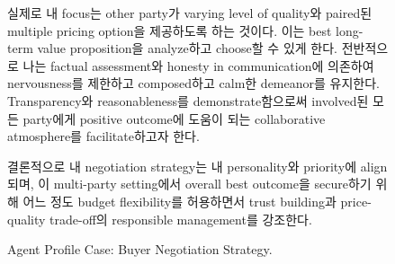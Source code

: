 \begin{figure}[htbp]
\begin{tcolorbox}[colback=blue!2!white, colframe=gray!50!blue]
\begin{minipage}{\linewidth}
실제로 내 focus는 other party가 varying level of quality와 paired된 multiple pricing option을 제공하도록 하는 것이다. 이는 best long-term value proposition을 analyze하고 choose할 수 있게 한다. 전반적으로 나는 factual assessment와 honesty in communication에 의존하여 nervousness를 제한하고 composed하고 calm한 demeanor를 유지한다. Transparency와 reasonableness를 demonstrate함으로써 involved된 모든 party에게 positive outcome에 도움이 되는 collaborative atmosphere를 facilitate하고자 한다.

결론적으로 내 negotiation strategy는 내 personality와 priority에 align되며, 이 multi-party setting에서 overall best outcome을 secure하기 위해 어느 정도 budget flexibility를 허용하면서 trust building과 price-quality trade-off의 responsible management를 강조한다.


\end{minipage}
\end{tcolorbox}
\caption{Agent Profile Case: Buyer Negotiation Strategy.}
\label{fig:agent-profile-case-buyer}
\end{figure}


